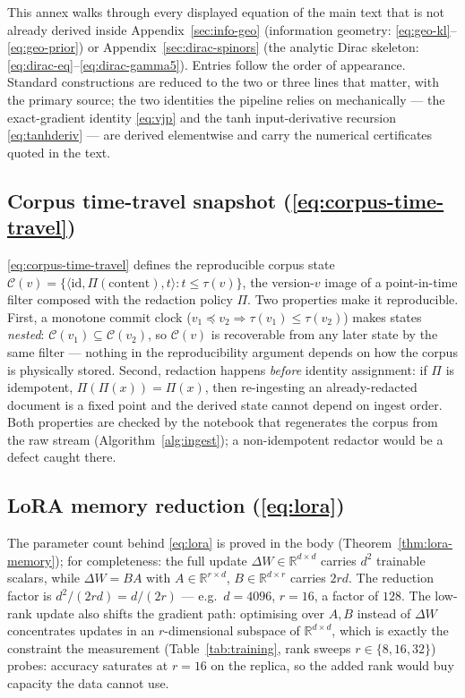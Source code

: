 \documentclass[11pt,a4paper]{article}
\theoremstyle{plain}
\theoremstyle{definition}
\begin{document}
This annex walks through every displayed equation of the main text that is
not already derived inside Appendix~\ref{sec:info-geo} (information
geometry: \eqref{eq:geo-kl}--\eqref{eq:geo-prior}) or
Appendix~\ref{sec:dirac-spinors} (the analytic Dirac skeleton:
\eqref{eq:dirac-eq}--\eqref{eq:dirac-gamma5}). Entries follow the order of
appearance. Standard constructions are reduced to the two or three lines
that matter, with the primary source; the two identities the pipeline
relies on mechanically --- the exact-gradient identity \eqref{eq:vjp} and
the tanh input-derivative recursion \eqref{eq:tanhderiv} --- are derived
elementwise and carry the numerical certificates quoted in the text.

\subsection{Corpus time-travel snapshot \texorpdfstring{(\eqref{eq:corpus-time-travel})}{}}
\label{app:timetravel}

\eqref{eq:corpus-time-travel} defines the reproducible corpus state
$\mathcal{C}(v)=\{\langle \mathrm{id},\Pi(\mathrm{content}),t\rangle:
t\le\tau(v)\}$, the version-$v$ image of a point-in-time filter composed
with the redaction policy $\Pi$. Two properties make it reproducible.
First, a monotone commit clock ($v_1\preceq v_2\Rightarrow
\tau(v_1)\le\tau(v_2)$) makes states \emph{nested}:
$\mathcal{C}(v_1)\subseteq\mathcal{C}(v_2)$, so $\mathcal{C}(v)$ is
recoverable from any later state by the same filter --- nothing in the
reproducibility argument depends on how the corpus is physically stored.
Second, redaction happens \emph{before} identity assignment: if $\Pi$ is
idempotent, $\Pi(\Pi(x))=\Pi(x)$, then re-ingesting an already-redacted
document is a fixed point and the derived state cannot depend on ingest
order. Both properties are checked by the notebook that regenerates the
corpus from the raw stream (Algorithm~\ref{alg:ingest}); a
non-idempotent redactor would be a defect caught there.

\subsection{LoRA memory reduction \texorpdfstring{(\eqref{eq:lora})}{}}
\label{app:lora}

The parameter count behind \eqref{eq:lora} is proved in the body
(Theorem~\ref{thm:lora-memory}); for completeness: the full update
$\Delta W\in\mathbb{R}^{d\times d}$ carries $d^2$ trainable scalars, while
$\Delta W=BA$ with $A\in\mathbb{R}^{r\times d}$, $B\in\mathbb{R}^{d\times r}$
carries $2rd$. The reduction factor is $d^2/(2rd)=d/(2r)$ --- e.g.\
$d=4096$, $r=16$, a factor of $128$. The low-rank update also shifts the
gradient path: optimising over $A,B$ instead of $\Delta W$ concentrates
updates in an $r$-dimensional subspace of $\mathbb{R}^{d\times d}$, which
is exactly the constraint the measurement
(Table~\ref{tab:training}, rank sweeps $r\in\{8,16,32\}$) probes:
accuracy saturates at $r=16$ on the replica, so the added rank would buy
capacity the data cannot use.
\end{document}
